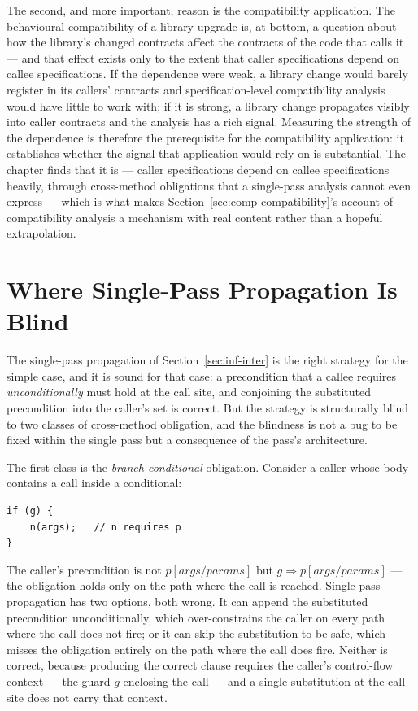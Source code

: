 The second, and more important, reason is the compatibility application. The
behavioural compatibility of a library upgrade is, at bottom, a question about how
the library's changed contracts affect the contracts of the code that calls it ---
and that effect exists only to the extent that caller specifications depend on
callee specifications. If the dependence were weak, a library change would barely
register in its callers' contracts and specification-level compatibility analysis
would have little to work with; if it is strong, a library change propagates
visibly into caller contracts and the analysis has a rich signal. Measuring the
strength of the dependence is therefore the prerequisite for the compatibility
application: it establishes whether the signal that application would rely on is
substantial. The chapter finds that it is --- caller specifications depend on
callee specifications heavily, through cross-method obligations that a single-pass
analysis cannot even express --- which is what makes
Section~\ref{sec:comp-compatibility}'s account of compatibility analysis a
mechanism with real content rather than a hopeful extrapolation.

\section{Where Single-Pass Propagation Is Blind}
\label{sec:comp-blind}

The single-pass propagation of Section~\ref{sec:inf-inter} is the right
strategy for the simple case, and it is sound for that case: a precondition that
a callee requires \emph{unconditionally} must hold at the call site, and
conjoining the substituted precondition into the caller's set is correct. But
the strategy is structurally blind to two classes of cross-method obligation,
and the blindness is not a bug to be fixed within the single pass but a
consequence of the pass's architecture.

The first class is the \emph{branch-conditional} obligation. Consider a caller
whose body contains a call inside a conditional:

\begin{lstlisting}
if (g) {
    n(args);   // n requires p
}
\end{lstlisting}

The caller's precondition is not $p[\mathit{args}/\mathit{params}]$ but
$g \Rightarrow p[\mathit{args}/\mathit{params}]$ --- the obligation holds only
on the path where the call is reached. Single-pass propagation has two options,
both wrong. It can append the substituted precondition unconditionally, which
over-constrains the caller on every path where the call does not fire; or it can
skip the substitution to be safe, which misses the obligation entirely on the
path where the call does fire. Neither is correct, because producing the correct
clause requires the caller's control-flow context --- the guard $g$ enclosing
the call --- and a single substitution at the call site does not carry that
context.

